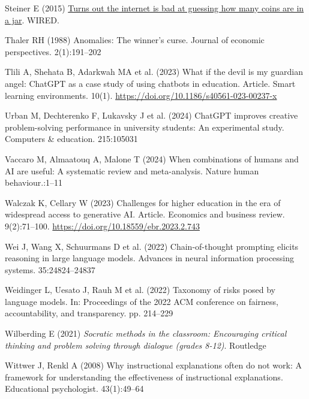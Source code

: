 \documentclass[
  11pt,
]{article}
\newlength{\cslhangindent}
\newenvironment{CSLReferences}[2] %
 {\begin{list}{}{%
  \setlength{\itemindent}{0pt}
  \setlength{\leftmargin}{0pt}
  \setlength{\parsep}{0pt}
  \ifodd #1
   \setlength{\leftmargin}{\cslhangindent}
   \setlength{\itemindent}{-1\cslhangindent}
  \fi
  \setlength{\itemsep}{#2\baselineskip}}}
 {\end{list}}
\begin{document}
\begin{CSLReferences}{1}{0}
Steiner E (2015) \href{https://www.wired.com/2015/01/coin-jar-crowd-wisdom-experiment-results/}{Turns out the internet is bad at guessing how many coins are in a jar}. WIRED.

Thaler RH (1988) Anomalies: The winner's curse. Journal of economic perspectives. 2(1):191--202

Tlili A, Shehata B, Adarkwah MA et al. (2023) What if the devil is my guardian angel: ChatGPT as a case study of using chatbots in education. Article. Smart learning environments. 10(1). \url{https://doi.org/10.1186/s40561-023-00237-x}

Urban M, Dechterenko F, Lukavsky J et al. (2024) ChatGPT improves creative problem-solving performance in university students: An experimental study. Computers \& education. 215:105031

Vaccaro M, Almaatouq A, Malone T (2024) When combinations of humans and AI are useful: A systematic review and meta-analysis. Nature human behaviour.:1--11

Walczak K, Cellary W (2023) Challenges for higher education in the era of widespread access to generative AI. Article. Economics and business review. 9(2):71--100. \url{https://doi.org/10.18559/ebr.2023.2.743}

Wei J, Wang X, Schuurmans D et al. (2022) Chain-of-thought prompting elicits reasoning in large language models. Advances in neural information processing systems. 35:24824--24837

Weidinger L, Uesato J, Rauh M et al. (2022) Taxonomy of risks posed by language models. In: Proceedings of the 2022 ACM conference on fairness, accountability, and transparency. pp. 214--229

Wilberding E (2021) \emph{Socratic methods in the classroom: Encouraging critical thinking and problem solving through dialogue (grades 8-12)}. Routledge

Wittwer J, Renkl A (2008) Why instructional explanations often do not work: A framework for understanding the effectiveness of instructional explanations. Educational psychologist. 43(1):49--64


\end{CSLReferences}
\end{document}
